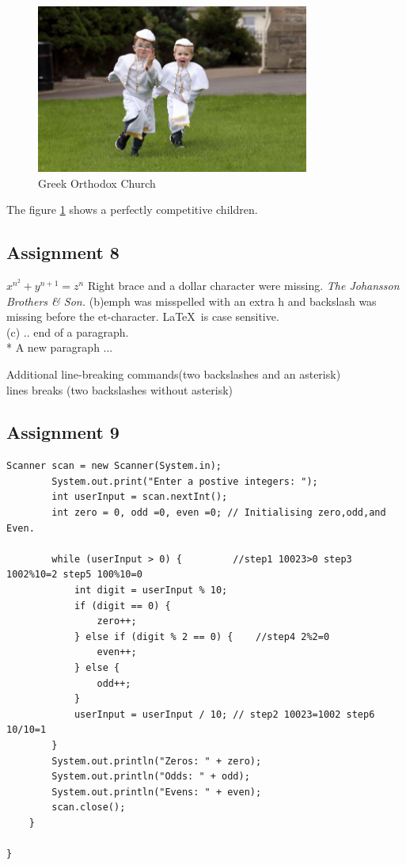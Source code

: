 \documentclass{article}
\begin{document}
\begin{figure}[h]
    \centering
    
    \includegraphics[width=0.8\textwidth, center]{image.jpg}
    \caption{Greek Orthodox Church}
    \label{fig:my_label}
\end{figure}

The figure \ref{fig:my_label} shows a perfectly competitive children.
  
\subsection{Assignment 8}
\begin{flushleft}
    $x^{n^2} + y^{n + 1} = z^n $  Right brace and a dollar character were missing.
\emph{The Johansson Brothers \& Son.}
(b)emph was misspelled with an extra h and backslash was missing before the et-character. \LaTeX\ is case sensitive.\\
(c) .. end of a paragraph. \\*
A new paragraph ...

Additional line-breaking commands(two backslashes and an asterisk)\\
lines breaks (two backslashes without asterisk)
\end{flushleft}




\subsection{Assignment 9}

\begin{lstlisting}
Scanner scan = new Scanner(System.in);
		System.out.print("Enter a postive integers: ");
		int userInput = scan.nextInt();
		int zero = 0, odd =0, even =0; // Initialising zero,odd,and Even.
		
		while (userInput > 0) {			//step1 10023>0 step3 1002%10=2 step5 100%10=0
			int digit = userInput % 10;		
			if (digit == 0) {
				zero++; 
			} else if (digit % 2 == 0) {	//step4 2%2=0
				even++; 
			} else {
				odd++; 
			}
			userInput = userInput / 10;	// step2 10023=1002 step6 10/10=1
		}
		System.out.println("Zeros: " + zero);
		System.out.println("Odds: " + odd);
		System.out.println("Evens: " + even);
		scan.close();
	}

}
\end{lstlisting}
\end{document}

